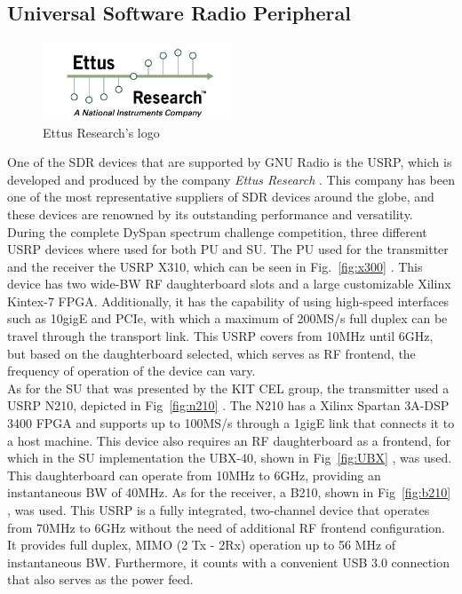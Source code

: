 \subsection{Universal Software Radio Peripheral}
\begin{figure}[htb]
    \centering
      \includegraphics[width=0.5\textwidth]{figures/ettus_logo}
      \caption{Ettus Research's logo}
      \label{fig:ettus}
\end{figure}

One of the \ac{SDR} devices that are supported by GNU Radio is the \ac{USRP}, which is developed and produced by the company \emph{Ettus Research\texttrademark} \cite{Ettus}. This company has been one of the most representative suppliers of \ac{SDR} devices around the globe, and these devices are renowned by its outstanding performance and versatility.\\

During the complete \ac{DySpan} spectrum challenge competition, three different \ac{USRP} devices where used for both \ac{PU} and \ac{SU}. The \ac{PU} used for the transmitter and the receiver the \ac{USRP} X310, which can be seen in Fig.~\ref{fig:x300} \cite{X300}. This device has two wide-\ac{BW} \ac{RF} daughterboard slots and a large customizable Xilinx Kintex-7 FPGA. Additionally, it has the capability of using high-speed interfaces such as 10gigE and PCIe, with which a maximum of 200MS/s full duplex can be travel through the transport link. This \ac{USRP} covers from 10MHz until 6GHz, but based on the daughterboard selected, which serves as \ac{RF} frontend, the frequency of operation of the device can vary.\\

As for the \ac{SU} that was presented by the \ac{KIT} \ac{CEL} group, the transmitter used a \ac{USRP} N210, depicted in Fig~\ref{fig:n210} \cite{N210}. The N210 has a Xilinx Spartan 3A-DSP 3400 FPGA and supports up to 100MS/s through a 1gigE link that connects it to a host machine.  This device also requires an \ac{RF} daughterboard as a frontend, for which in the \ac{SU} implementation the UBX-40, shown in Fig~\ref{fig:UBX} \cite{UBX}, was used. This daughterboard can operate from 10MHz to 6GHz, providing an instantaneous \ac{BW} of 40MHz. As for the receiver, a B210, shown in Fig~\ref{fig:b210} \cite{B210}, was used. This \ac{USRP} is a fully integrated, two-channel device that operates from 70MHz to 6GHz without the need of additional \ac{RF} frontend configuration. It provides full duplex, MIMO (2 Tx - 2Rx) operation up to 56 MHz of instantaneous \ac{BW}. Furthermore, it counts with a convenient USB 3.0 connection that also serves as the power feed.\\

